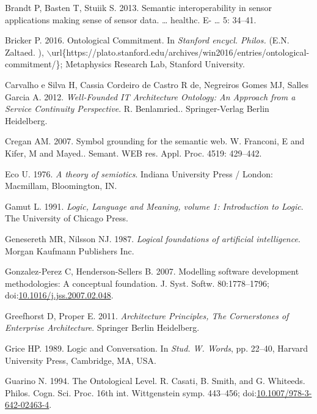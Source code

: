 \documentclass[a4paper,11pt,oneside,oldfontcommands]{memoir}
\theoremstyle{definition}
\theoremstyle{break}		%
\numberwithin{equation}{chapter}
\numberwithin{figure}{chapter}
\begin{document}
\leavevmode\hypertarget{ref-Brandt2013}{}%
Brandt P, Basten T, Stuiik S. 2013. Semantic interoperability in sensor
applications making sense of sensor data. \ldots{} healthc. E- \ldots{}
5: 34--41.

\leavevmode\hypertarget{ref-Bricker2016}{}%
Bricker P. 2016. Ontological Commitment. In \emph{Stanford encycl.
Philos.} (E.N. Zaltaed. ),
\(\backslash\)url\{https://plato.stanford.edu/archives/win2016/entries/ontological-commitment/\};
Metaphysics Research Lab, Stanford University.

\leavevmode\hypertarget{ref-CarvalhoeSilva2012}{}%
Carvalho e Silva H, Cassia Cordeiro de Castro R de, Negreiros Gomes MJ,
Salles Garcia A. 2012. \emph{Well-Founded IT Architecture Ontology: An
Approach from a Service Continuity Perspective}. R. Benlamried..
Springer-Verlag Berlin Heidelberg.

\leavevmode\hypertarget{ref-Cregan2007}{}%
Cregan AM. 2007. Symbol grounding for the semantic web. W. Franconi, E
and Kifer, M and Mayed.. Semant. WEB res. Appl. Proc. 4519: 429--442.

\leavevmode\hypertarget{ref-Eco1976}{}%
Eco U. 1976. \emph{A theory of semiotics}. Indiana University Press /
London: Macmillam, Bloomington, IN.

\leavevmode\hypertarget{ref-Gamut1991}{}%
Gamut L. 1991. \emph{Logic, Language and Meaning, volume 1: Introduction
to Logic}. The University of Chicago Press.

\leavevmode\hypertarget{ref-Genesereth:1987dg}{}%
Genesereth MR, Nilsson NJ. 1987. \emph{Logical foundations of artificial
intelligence}. Morgan Kaufmann Publishers Inc.

\leavevmode\hypertarget{ref-Gonzalez-Perez2007}{}%
Gonzalez-Perez C, Henderson-Sellers B. 2007. Modelling software
development methodologies: A conceptual foundation. J. Syst. Softw.
80:1778--1796;
doi:\href{https://doi.org/10.1016/j.jss.2007.02.048}{10.1016/j.jss.2007.02.048}.

\leavevmode\hypertarget{ref-Greefhorst2011}{}%
Greefhorst D, Proper E. 2011. \emph{Architecture Principles, The
Cornerstones of Enterprise Architecture}. Springer Berlin Heidelberg.

\leavevmode\hypertarget{ref-Grice:1991BT}{}%
Grice HP. 1989. Logic and Conversation. In \emph{Stud. W. Words}, pp.
22--40, Harvard University Press, Cambridge, MA, USA.

\leavevmode\hypertarget{ref-Guarino1994b}{}%
Guarino N. 1994. The Ontological Level. R. Casati, B. Smith, and G.
Whiteeds. Philos. Cogn. Sci. Proc. 16th int. Wittgenstein symp.
443--456;
doi:\href{https://doi.org/10.1007/978-3-642-02463-4}{10.1007/978-3-642-02463-4}.
\end{document}
